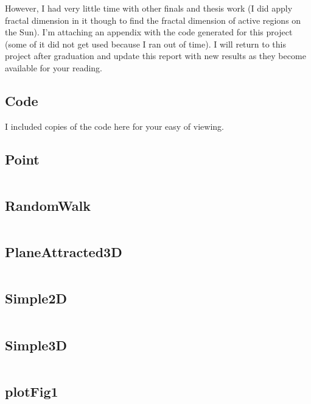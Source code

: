 \documentclass{article}
\begin{document}
However, I had very little time with other finals and thesis work (I did apply fractal dimension in it though to find the fractal dimension of active regions on the Sun). I'm attaching an appendix with the code generated for this project (some of it did not get used because I ran out of time). I will return to this project after graduation and update this report with new results as they become available for your reading. 

\newpage




\newpage

\singlespace
\begin{appendices}
  \section{Code}
  I included copies of the code here for your easy of viewing. 
  
  \subsection{Point}
  \inputminted{java}{../src/Point.java}

  \subsection{RandomWalk}
  \inputminted{java}{../src/RandomWalk.java}

  \subsection{PlaneAttracted3D}
  \inputminted{java}{../src/PlaneAttracted3D.java}

  \subsection{Simple2D}
  \inputminted{java}{../src/Simple2D.java}
  
  \subsection{Simple3D}
  \inputminted{java}{../src/Simple3D.java}

  \subsection{plotFig1}
  \inputminted{python}{../src/plotFig1.py}
  

\end{appendices}
\end{document}
